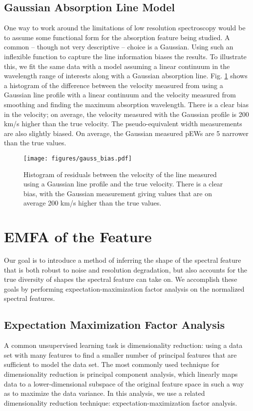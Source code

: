 \subsection{Gaussian Absorption Line Model}
One way to work around the limitations of low resolution spectroscopy would be to assume some functional form for the absorption feature being studied. A common -- though not very descriptive -- choice is a Gaussian. Using such an inflexible function to capture the line information biases the results. To illustrate this, we fit the same data with a model assuming a linear continuum in the wavelength range of interests along with a Gaussian absorption line. Fig. \ref{gauss_bias} shows a histogram of the difference between the velocity measured from using a Gaussian line profile with a linear continuum and the velocity measured from smoothing and finding the maximum absorption wavelength. There is a clear bias in the velocity; on average, the velocity measured with the Gaussian profile is 200 km/s higher than the true velocity. The pseudo-equivalent width measurements are also slightly biased. On average, the Gaussian measured pEWs are 5 \angstrom\; narrower than the true values.

\begin{figure}[!htb]
    \centering
    \texttt{[image: figures/gauss\_bias.pdf]}
    \caption{Histogram of residuals between the velocity of the \siliconii\; line measured using a Gaussian line profile and the true velocity. There is a clear bias, with the Gaussian measurement giving values that are on average 200 km/s higher than the true values.}
    \label{gauss_bias}
\end{figure}


\section{EMFA of the \siliconii\; Feature}
\label{method}
Our goal is to introduce a method of inferring the shape of the spectral feature that is both robust to noise and resolution degradation, but also accounts for the true diversity of shapes the spectral feature can take on. We accomplish these goals by performing expectation-maximization factor analysis on the normalized spectral features.

\subsection{Expectation Maximization Factor Analysis}
A common unsupervised learning task is dimensionality reduction: using a data set with many features to find a smaller number of principal features that are sufficient to model the data set. The most commonly used technique for dimensionality reduction is principal component analysis, which linearly maps data to a lower-dimensional subspace of the original feature space in such a way as to maximize the data variance. In this analysis, we use a related dimensionality reduction technique: expectation-maximization factor analysis.

